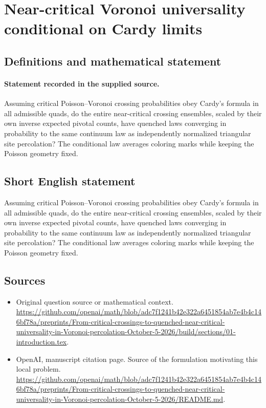 \documentclass[11pt]{article}
\begin{document}
\section*{Near-critical Voronoi universality conditional on Cardy limits}\label{30007406}
\subsection{Definitions and mathematical statement}
\paragraph{Statement recorded in the supplied source.}
Assuming critical Poisson–Voronoi crossing probabilities obey Cardy’s formula in all admissible quads, do the entire near-critical crossing ensembles, scaled by their own inverse expected pivotal counts, have quenched laws converging in probability to the same continuum law as independently normalized triangular site percolation? The conditional law averages coloring marks while keeping the Poisson geometry fixed.
\subsection{Short English statement}
Assuming critical Poisson–Voronoi crossing probabilities obey Cardy’s formula in all admissible quads, do the entire near-critical crossing ensembles, scaled by their own inverse expected pivotal counts, have quenched laws converging in probability to the same continuum law as independently normalized triangular site percolation? The conditional law averages coloring marks while keeping the Poisson geometry fixed.
\subsection{Sources}
\begin{itemize}
\item[S1] Original question source or mathematical context.
\url{https://github.com/openai/math/blob/adc7f1241b42e322a6451854ab7e4b4c146bf78a/preprints/From-critical-crossings-to-quenched-near-critical-universality-in-Voronoi-percolation-October-5-2026/build/sections/01-introduction.tex}.
\item[S2] OpenAI, manuscript citation page. Source of the formulation motivating this local problem.
\url{https://github.com/openai/math/blob/adc7f1241b42e322a6451854ab7e4b4c146bf78a/preprints/From-critical-crossings-to-quenched-near-critical-universality-in-Voronoi-percolation-October-5-2026/README.md}.
\end{itemize}
\end{document}
